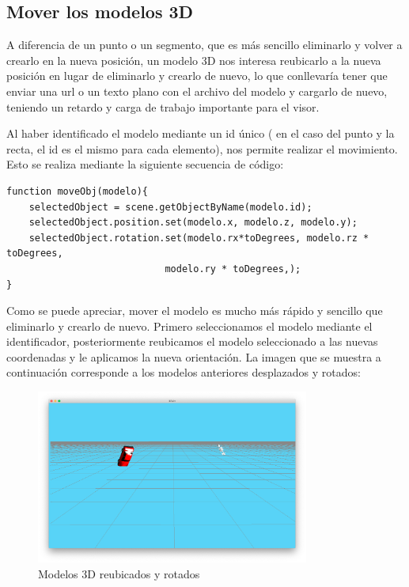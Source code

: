 \subsection{Mover los modelos 3D}
A diferencia de un punto o un segmento, que es más sencillo eliminarlo y volver a crearlo en la nueva posición, un modelo 3D nos interesa reubicarlo a la nueva posición en lugar de eliminarlo y crearlo de nuevo, lo que conllevaría tener que enviar una url o un texto plano con el archivo del modelo y cargarlo de nuevo, teniendo un retardo y carga de trabajo importante para el visor.

Al haber identificado el modelo mediante un id único ( en el caso del punto y la recta, el id es el mismo para cada elemento), nos permite realizar el movimiento. Esto se realiza mediante la siguiente secuencia de código:
\begin{lstlisting}[frame=single]
function moveObj(modelo){
	selectedObject = scene.getObjectByName(modelo.id);
	selectedObject.position.set(modelo.x, modelo.z, modelo.y);
	selectedObject.rotation.set(modelo.rx*toDegrees, modelo.rz * toDegrees, 
							modelo.ry * toDegrees,);
}
\end{lstlisting}
Como se puede apreciar, mover el modelo es mucho más rápido y sencillo que eliminarlo y crearlo de nuevo. Primero seleccionamos el modelo mediante el identificador, posteriormente reubicamos el modelo seleccionado a las nuevas coordenadas y le aplicamos la nueva orientación. La imagen que se muestra a continuación corresponde a los modelos anteriores desplazados y rotados:
\begin{figure}[H]
  \begin{center}
    \includegraphics[width=0.8\textwidth]{figures/movermodelos.png}
		\caption{Modelos 3D reubicados y rotados}
		\label{fig.movermodelos}
		\end{center}
\end{figure}
